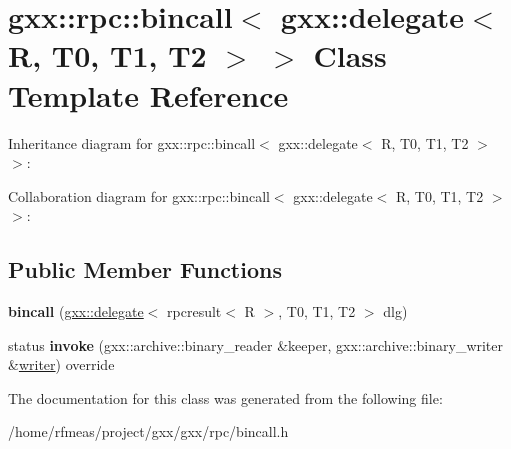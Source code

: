 \hypertarget{classgxx_1_1rpc_1_1bincall_3_01gxx_1_1delegate_3_01R_00_01T0_00_01T1_00_01T2_01_4_01_4}{}\section{gxx\+:\+:rpc\+:\+:bincall$<$ gxx\+:\+:delegate$<$ R, T0, T1, T2 $>$ $>$ Class Template Reference}
\label{classgxx_1_1rpc_1_1bincall_3_01gxx_1_1delegate_3_01R_00_01T0_00_01T1_00_01T2_01_4_01_4}


Inheritance diagram for gxx\+:\+:rpc\+:\+:bincall$<$ gxx\+:\+:delegate$<$ R, T0, T1, T2 $>$ $>$\+:


Collaboration diagram for gxx\+:\+:rpc\+:\+:bincall$<$ gxx\+:\+:delegate$<$ R, T0, T1, T2 $>$ $>$\+:
\subsection*{Public Member Functions}
\begin{DoxyCompactItemize}
\item 
{\bfseries bincall} (\hyperlink{classgxx_1_1delegate}{gxx\+::delegate}$<$ rpcresult$<$ R $>$, T0, T1, T2 $>$ dlg)\hypertarget{classgxx_1_1rpc_1_1bincall_3_01gxx_1_1delegate_3_01R_00_01T0_00_01T1_00_01T2_01_4_01_4_add91072889278f4ddd8bc3fdb3160b0d}{}\label{classgxx_1_1rpc_1_1bincall_3_01gxx_1_1delegate_3_01R_00_01T0_00_01T1_00_01T2_01_4_01_4_add91072889278f4ddd8bc3fdb3160b0d}

\item 
status {\bfseries invoke} (gxx\+::archive\+::binary\+\_\+reader \&keeper, gxx\+::archive\+::binary\+\_\+writer \&\hyperlink{classgxx_1_1writer}{writer}) override\hypertarget{classgxx_1_1rpc_1_1bincall_3_01gxx_1_1delegate_3_01R_00_01T0_00_01T1_00_01T2_01_4_01_4_a07f96fda38a384a9ffacdbcb4c2c2493}{}\label{classgxx_1_1rpc_1_1bincall_3_01gxx_1_1delegate_3_01R_00_01T0_00_01T1_00_01T2_01_4_01_4_a07f96fda38a384a9ffacdbcb4c2c2493}

\end{DoxyCompactItemize}


The documentation for this class was generated from the following file\+:\begin{DoxyCompactItemize}
\item 
/home/rfmeas/project/gxx/gxx/rpc/bincall.\+h\end{DoxyCompactItemize}
